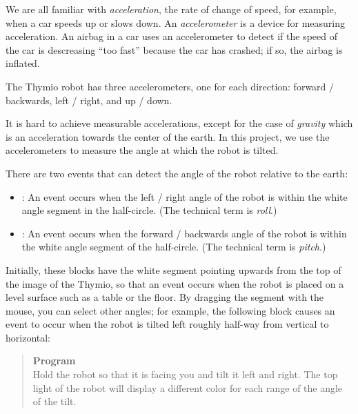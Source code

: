 \label{ch.angles}

We are all familiar with \emph{acceleration}, the rate of change of
speed, for example, when a car speeds up or slows down. An
\emph{accelerometer} is a device for measuring acceleration. An airbag
in a car uses an accelerometer to detect if the speed of the car is
descreasing ``too fast'' because the car has crashed; if so, the airbag
is inflated.

The Thymio robot has three accelerometers, one for each direction:
forward / backwards, left / right, and up / down.


It is hard to achieve measurable accelerations, except for the case of
\emph{gravity} which is an acceleration towards the center of the earth.
In this project, we use the accelerometers to measure the angle at which
the robot is tilted.

There are two events that can detect the angle of the robot relative to
the earth: \label{p.accel}

\begin{itemize}

\item {}: An event occurs when the left / right angle of
the robot is within the white angle segment in the half-circle. (The
technical term is \emph{roll}.)

\item {}: An event occurs when the forward /
backwards angle of the robot is within the white angle segment of the
half-circle. (The technical term is \emph{pitch}.)

\end{itemize}

Initially, these blocks have the white segment pointing upwards from the
top of the image of the Thymio, so that an event occurs when the robot
is placed on a level surface such as a table or the floor. By dragging
the segment with the mouse, you can select other angles; for
example, the following block causes an event to occur when the robot is
tilted left roughly half-way from vertical to horizontal:


\begin{quote}
\textbf{Program}\\
Hold the robot so that it is facing you and tilt it left and right. The
top light of the robot will display a different color for each range
of the angle of the tilt.
\end{quote}

